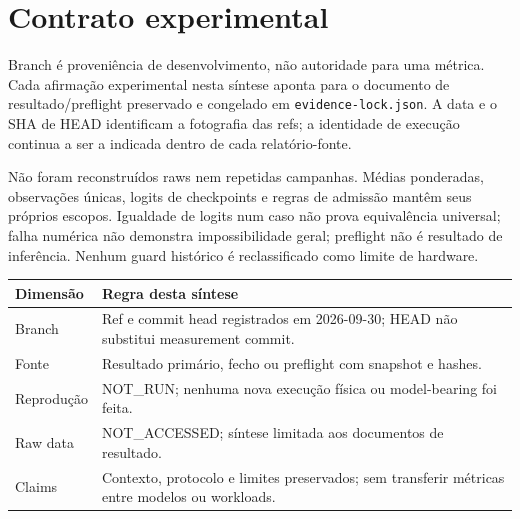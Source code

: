 \section{Contrato experimental}
Branch é proveniência de desenvolvimento, não autoridade para uma métrica. Cada afirmação experimental nesta síntese aponta para o documento de resultado/preflight preservado e congelado em \texttt{evidence-lock.json}. A data e o SHA de HEAD identificam a fotografia das refs; a identidade de execução continua a ser a indicada dentro de cada relatório-fonte.

Não foram reconstruídos raws nem repetidas campanhas. Médias ponderadas, observações únicas, logits de checkpoints e regras de admissão mantêm seus próprios escopos. Igualdade de logits num caso não prova equivalência universal; falha numérica não demonstra impossibilidade geral; preflight não é resultado de inferência. Nenhum guard histórico é reclassificado como limite de hardware.

\begin{tabularx}{\linewidth}{@{}p{38mm}Y@{}}
\toprule
\textbf{Dimensão} & \textbf{Regra desta síntese}\\\midrule
Branch & Ref e commit head registrados em 2026-09-30; HEAD não substitui measurement commit.\\
Fonte & Resultado primário, fecho ou preflight com snapshot e hashes.\\
Reprodução & NOT\_RUN; nenhuma nova execução física ou model-bearing foi feita.\\
Raw data & NOT\_ACCESSED; síntese limitada aos documentos de resultado.\\
Claims & Contexto, protocolo e limites preservados; sem transferir métricas entre modelos ou workloads.\\
\bottomrule
\end{tabularx}
